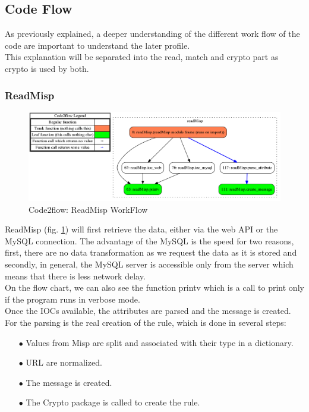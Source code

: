 \documentclass{eplmastersthesis}
\begin{document}
\subsection{Code Flow}
As previously explained, a deeper understanding of the different work flow of the code are important to understand the later profile.\\
This explanation will be separated into the read, match and crypto part as crypto is used by both.

\subsubsection{ReadMisp}
\begin{figure}[h!]
\begin{center}
	\includegraphics[scale=0.3]{res/flowReadMisp}
	\caption{Code2flow: ReadMisp WorkFlow}
	\label{code2flow-readMisp}
\end{center}
\end{figure}
ReadMisp (fig. \ref{code2flow-readMisp}) will first retrieve the data, either via the web API or the MySQL connection. The advantage of the MySQL is the speed for two reasons, first, there are no data transformation as we request the data as it is stored and secondly, in general, the MySQL server is accessible only from the server which means that there is less network delay.\\
On the flow chart, we can also see the function printv which is a call to print only if the program runs in verbose mode.\\
Once the IOCs available, the attributes are parsed and the message is created.\\
For the parsing is the real creation of the rule, which is done in several steps:

\begin{itemize}
\item[$\bullet$] Values from Misp are split and associated with their type in a dictionary.
\item[$\bullet$] URL are normalized.
\item[$\bullet$] The message is created.
\item[$\bullet$] The Crypto package is called to create the rule.
\end{itemize}
\end{document}
